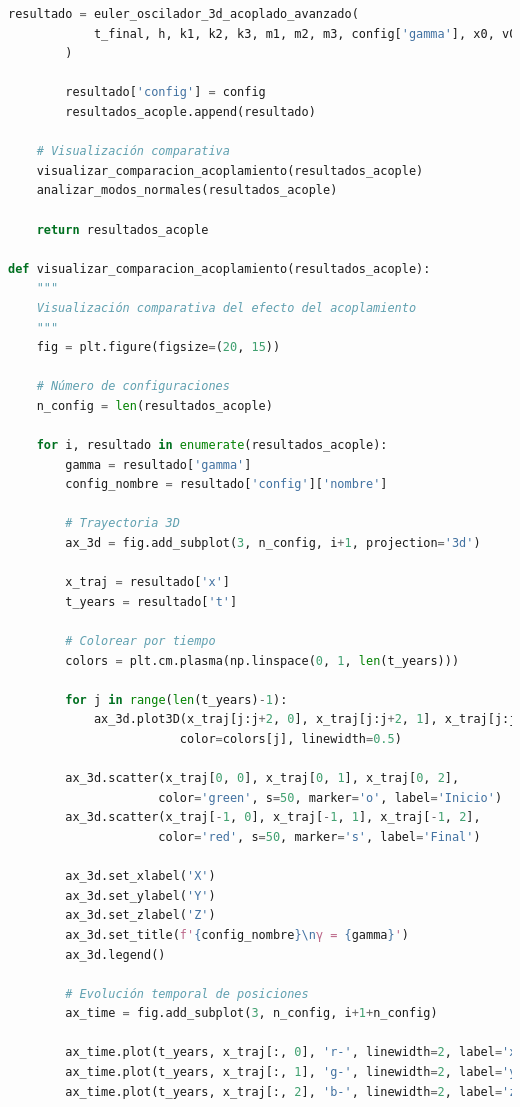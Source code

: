 \documentclass{article}
\begin{document}
\begin{lstlisting}[language=Python, caption={Análisis completo de figuras de Lissajous 3D y osciladores acoplados}]
        resultado = euler_oscilador_3d_acoplado_avanzado(
            t_final, h, k1, k2, k3, m1, m2, m3, config['gamma'], x0, v0
        )
        
        resultado['config'] = config
        resultados_acople.append(resultado)
    
    # Visualización comparativa
    visualizar_comparacion_acoplamiento(resultados_acople)
    analizar_modos_normales(resultados_acople)
    
    return resultados_acople

def visualizar_comparacion_acoplamiento(resultados_acople):
    """
    Visualización comparativa del efecto del acoplamiento
    """
    fig = plt.figure(figsize=(20, 15))
    
    # Número de configuraciones
    n_config = len(resultados_acople)
    
    for i, resultado in enumerate(resultados_acople):
        gamma = resultado['gamma']
        config_nombre = resultado['config']['nombre']
        
        # Trayectoria 3D
        ax_3d = fig.add_subplot(3, n_config, i+1, projection='3d')
        
        x_traj = resultado['x']
        t_years = resultado['t']
        
        # Colorear por tiempo
        colors = plt.cm.plasma(np.linspace(0, 1, len(t_years)))
        
        for j in range(len(t_years)-1):
            ax_3d.plot3D(x_traj[j:j+2, 0], x_traj[j:j+2, 1], x_traj[j:j+2, 2], 
                        color=colors[j], linewidth=0.5)
        
        ax_3d.scatter(x_traj[0, 0], x_traj[0, 1], x_traj[0, 2], 
                     color='green', s=50, marker='o', label='Inicio')
        ax_3d.scatter(x_traj[-1, 0], x_traj[-1, 1], x_traj[-1, 2], 
                     color='red', s=50, marker='s', label='Final')
        
        ax_3d.set_xlabel('X')
        ax_3d.set_ylabel('Y')
        ax_3d.set_zlabel('Z')
        ax_3d.set_title(f'{config_nombre}\nγ = {gamma}')
        ax_3d.legend()
        
        # Evolución temporal de posiciones
        ax_time = fig.add_subplot(3, n_config, i+1+n_config)
        
        ax_time.plot(t_years, x_traj[:, 0], 'r-', linewidth=2, label='x(t)', alpha=0.8)
        ax_time.plot(t_years, x_traj[:, 1], 'g-', linewidth=2, label='y(t)', alpha=0.8)
        ax_time.plot(t_years, x_traj[:, 2], 'b-', linewidth=2, label='z(t)', alpha=0.8)
        

\end{lstlisting}
\end{document}
